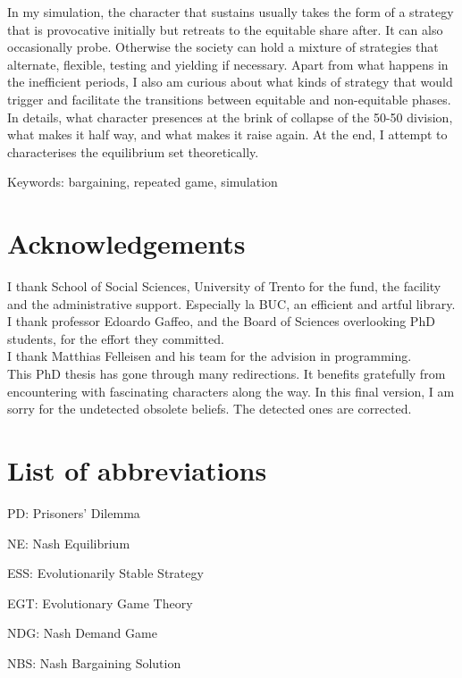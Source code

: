\documentclass[12.5pt]{report}
\begin{document}
In my simulation, the character that sustains usually takes the form of a strategy that is provocative initially but retreats to the equitable share after. It can also occasionally probe. Otherwise the society can hold a mixture of strategies that alternate, flexible, testing and yielding if necessary. Apart from what happens in the inefficient periods, I also am curious about what kinds of strategy that would trigger and facilitate the transitions between equitable and non-equitable phases. In details, what character presences at the brink of collapse of the 50-50 division, what makes it half way, and what makes it raise again. At the end, I attempt to characterises the equilibrium set theoretically.


Keywords: bargaining, repeated game, simulation

\chapter*{Acknowledgements}

I thank School of Social Sciences, University of Trento for the fund, the facility and the administrative support. Especially la BUC, an efficient and artful library.\\

I thank professor Edoardo Gaffeo, and the Board of Sciences overlooking PhD students, for the effort they committed.\\

I thank Matthias Felleisen and his team for the advision in programming.\\

This PhD thesis has gone through many redirections. It benefits gratefully from encountering with fascinating characters along the way. In this final version, I am sorry for the undetected obsolete beliefs. The detected ones are corrected.\\

\chapter*{List of abbreviations}

PD: Prisoners' Dilemma

NE: Nash Equilibrium

ESS: Evolutionarily Stable Strategy

EGT: Evolutionary Game Theory

NDG: Nash Demand Game

NBS: Nash Bargaining Solution\\
\end{document}

